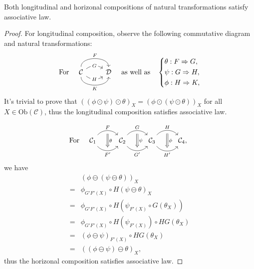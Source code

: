 \documentclass{article}
\begin{document}
\begin{thm}
	Both longitudinal and horizonal compositions of natural transformations satisfy associative law.
\end{thm}
\begin{proof}
	For longitudinal composition, observe the following commutative diagram and natural transformations:
	\[\text{For}\quad\begin{tikzcd}
		\mathcal{C}
			\arrow[r, bend left =90, "F"]
			\arrow[r, bend left =35, "G" description] 
			\arrow[r, bend right=35, "H" description]
			\arrow[r, bend right=90, "K"'] &
		\mathcal{D}
	\end{tikzcd}\quad\text{as well as}\quad
	\left\{\begin{aligned}
		& \theta:F\Rightarrow G,\\
		& \psi:G\Rightarrow H,\\
		& \phi:H\Rightarrow K,
	\end{aligned}\right.\]
	It's trivial to prove that $((\phi\odot\psi)\odot\theta)_X=(\phi\odot(\psi\odot\theta))_X$ for all $X\in \mathrm{Ob}(\mathcal{C})$, thus the longitudinal composition satisfies associative law.

	\[\text{For}\quad\begin{tikzcd}
		\mathcal{C}_1 \arrow[bend left=50, r, "F", ""' name=F] \arrow[bend right=50, r, "F'"', "" name=F'] &
		\mathcal{C}_2 \arrow[bend left=50, r, "G", ""' name=G] \arrow[bend right=50, r, "G'"', "" name=G'] &	
		\mathcal{C}_3 \arrow[bend left=50, r, "H", ""' name=H] \arrow[bend right=50, r, "H'"', "" name=H'] &
		\arrow[Rightarrow, from=F, to=F', "\theta"]
		\arrow[Rightarrow, from=G, to=G', "\psi"]
		\arrow[Rightarrow, from=H, to=H', "\phi"]
		\mathcal{C}_4,
	\end{tikzcd}\]
	we have
	\begin{align}
		 & (\phi\ominus(\psi\ominus\theta))_X\tag{Assumption}\\
		=& \phi_{G'F'(X)}\circ H(\psi\ominus\theta)_X\tag{Def: horizontal composition}\\
		=& \phi_{G'F'(X)}\circ H(\psi_{F'(X)}\circ G(\theta_X))\tag{Ditto}\\
		=& \phi_{G'F'(X)}\circ H(\psi_{F'(X)})\circ HG(\theta_X)\tag{Property of functor $H$}\\
		=& (\phi\ominus\psi)_{F'(X)}\circ HG(\theta_X)\tag{Def: horizontal composition}\\
		=& ((\phi\ominus\psi)\ominus\theta)_X\tag{Ditto},
	\end{align}
	thus the horizonal composition satisfies associative law.
\end{proof}
\end{document}
